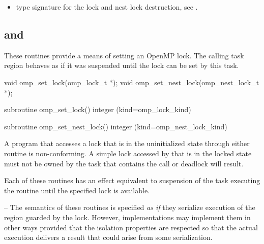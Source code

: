 \crossreferences
\begin{itemize}
\item {} type signature for the lock
  and nest lock destruction, see .
\end{itemize}









\subsection{ and }
\label{subsec:omp_set_lock and omp_set_nest_lock}
\summary
These routines provide a means of setting an OpenMP lock. The calling
task region behaves as if it was suspended until the lock can be set
by this task.

\format
\ccppspecificstart
\begin{boxedcode}
void omp\_set\_lock(omp\_lock\_t *);
void omp\_set\_nest\_lock(omp\_nest\_lock\_t *);
\end{boxedcode}
\ccppspecificend

\fortranspecificstart
\begin{boxedcode}
subroutine omp\_set\_lock()
integer (kind=omp\_lock\_kind) 

subroutine omp\_set\_nest\_lock()
integer (kind=omp\_nest\_lock\_kind) 
\end{boxedcode}
\fortranspecificend

\constraints
A program that accesses a lock that is in the uninitialized state through either routine is 
non-conforming. A simple lock accessed by  that is in the locked state 
must not be owned by the task that contains the call or deadlock will result.

\effect
Each of these routines has an effect equivalent to suspension of the task
executing the routine until the specified lock is available. 


\notestart \noteheader – The semantics of these routines is specified
\emph{as if} they serialize execution of the region guarded by the
lock. However, implementations may implement them in other ways
provided that the isolation properties are respected so that the
actual execution delivers a result that could arise from some
serialization. 
\noteend

